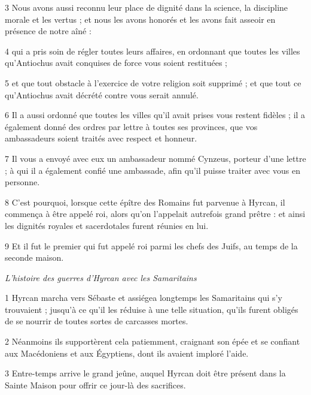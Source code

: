 \par 3 Nous avons aussi reconnu leur place de dignité dans la science, la discipline morale et les vertus ; et nous les avons honorés et les avons fait asseoir en présence de notre aîné :

\par 4 qui a pris soin de régler toutes leurs affaires, en ordonnant que toutes les villes qu'Antiochus avait conquises de force vous soient restituées ;

\par 5 et que tout obstacle à l'exercice de votre religion soit supprimé ; et que tout ce qu'Antiochus avait décrété contre vous serait annulé.

\par 6 Il a aussi ordonné que toutes les villes qu'il avait prises vous restent fidèles ; il a également donné des ordres par lettre à toutes ses provinces, que vos ambassadeurs soient traités avec respect et honneur.

\par 7 Il vous a envoyé avec eux un ambassadeur nommé Cynzeus, porteur d'une lettre ; à qui il a également confié une ambassade, afin qu'il puisse traiter avec vous en personne.

\par 8 C'est pourquoi, lorsque cette épître des Romains fut parvenue à Hyrcan, il commença à être appelé roi, alors qu'on l'appelait autrefois grand prêtre : et ainsi les dignités royales et sacerdotales furent réunies en lui.

\par 9 Et il fut le premier qui fut appelé roi parmi les chefs des Juifs, au temps de la seconde maison.



\par \textit{L'histoire des guerres d'Hyrcan avec les Samaritains}

\par 1 Hyrcan marcha vers Sébaste et assiégea longtemps les Samaritains qui s'y trouvaient ; jusqu'à ce qu'il les réduise à une telle situation, qu'ils furent obligés de se nourrir de toutes sortes de carcasses mortes.

\par 2 Néanmoins ils supportèrent cela patiemment, craignant son épée et se confiant aux Macédoniens et aux Égyptiens, dont ils avaient imploré l'aide.

\par 3 Entre-temps arrive le grand jeûne, auquel Hyrcan doit être présent dans la Sainte Maison pour offrir ce jour-là des sacrifices.

